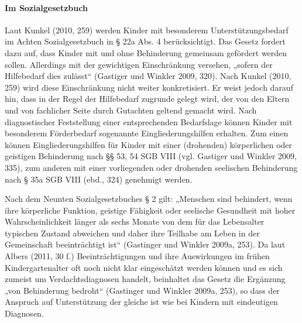 \paragraph{Im Sozialgesetzbuch}
Laut Kunkel (2010, 259) werden Kinder mit besonderem Unterstützungsbedarf im Achten Sozialgesetzbuch in § 22a Abs. 4 berücksichtigt. Das Gesetz fordert dazu auf, dass Kinder mit und ohne Behinderung gemeinsam gefördert werden sollen. Allerdings mit der gewichtigen Einschränkung versehen, „sofern der Hilfebedarf dies zulässt“ (Gastiger und Winkler 2009, 320). Nach Kunkel (2010, 259) wird diese Einschränkung nicht weiter konkretisiert. Er weist jedoch darauf hin, dass in der Regel der Hilfebedarf zugrunde gelegt wird, der von den Eltern und von fachlicher Seite durch Gutachten geltend gemacht wird. Nach diagnostischer Feststellung einer entsprechenden Bedarfslage können Kinder mit besonderem Förderbedarf sogenannte Eingliederungshilfen erhalten. Zum einen können Eingliederungshilfen für Kinder mit einer (drohenden) körperlichen oder geistigen Behinderung nach §§ 53, 54 SGB VIII (vgl. Gastiger und Winkler 2009, 335), zum anderen mit einer vorliegenden oder drohenden seelischen Behinderung nach § 35a SGB VIII (ebd., 324) genehmigt werden.
 
Nach dem Neunten Sozialgesetzbuches § 2 gilt: „Menschen sind behindert, wenn ihre körperliche Funktion, geistige Fähigkeit oder seelische Gesundheit mit hoher Wahrscheinlichkeit länger als sechs Monate von dem für das Lebensalter typischen Zustand abweichen und daher ihre Teilhabe am Leben in der Gemeinschaft beeinträchtigt ist“ (Gastinger und Winkler 2009a, 253). Da laut Albers (2011, 30 f.) Beeinträchtigungen und ihre Auswirkungen im frühen Kindergartenalter oft noch nicht klar eingeschätzt werden können und es sich zumeist um Verdachtsdiagnosen handelt, beinhaltet das Gesetz die Ergänzung „von Behinderung bedroht“ (Gastinger und Winkler 2009a, 253), so dass der Anspruch auf Unterstützung der gleiche ist wie bei Kindern mit eindeutigen Diagnosen.

